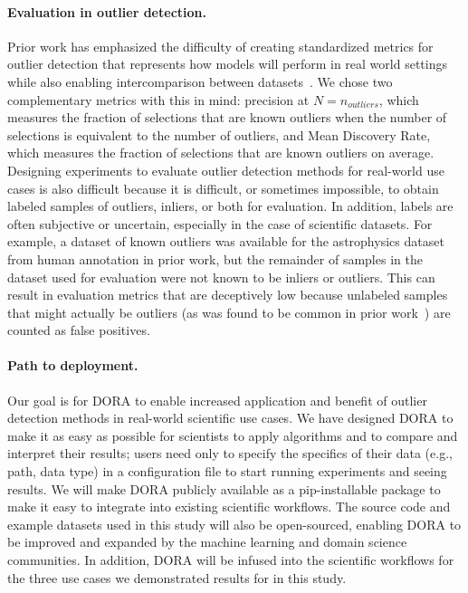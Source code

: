\documentclass[letterpaper]{article} %
\begin{document}
\paragraph{Evaluation in outlier detection.} 
Prior work has emphasized
the difficulty of creating standardized metrics for outlier detection that 
represents how models will perform in real world settings while also enabling
intercomparison between datasets~\cite{campos2016evaluation}. We chose two
complementary metrics with this in mind: precision at $N=n_{outliers}$, which
measures the fraction of selections that are known outliers when the number of
selections is equivalent to the number of outliers, and
 Mean Discovery Rate, which measures the fraction of selections that are known outliers on average. 
Designing experiments to evaluate outlier detection methods for real-world
use cases is also difficult because it is difficult, or sometimes impossible, 
to obtain labeled samples of outliers, inliers, or both for evaluation. 
In addition, labels are often subjective or uncertain, 
especially in the case of scientific datasets. For example, a dataset of known
outliers was available for the astrophysics dataset from human annotation
in prior work, but the remainder of samples in the dataset used for evaluation
were not known to be inliers or outliers. This can result in evaluation metrics
 that are deceptively low because unlabeled samples that might actually be
 outliers (as was found to be common in prior work~\cite{wagstaff:des-anom20})
 are counted as false positives. 

\paragraph{Path to deployment.} 
Our goal is for DORA to enable increased application and benefit of
outlier detection methods in real-world scientific use cases. We have 
designed DORA to make it as easy as possible for scientists to apply
algorithms and to compare and interpret their results; users need only
to specify the specifics of their data (e.g., path, data type) in a 
configuration file to start running experiments and seeing results. We will
make DORA publicly available as a pip-installable package to make it
easy to integrate into existing scientific workflows. 
The source code and example datasets used in this study will also be 
open-sourced, enabling DORA to be improved and expanded by the 
machine learning and domain science communities. 
In addition, DORA will be infused into the scientific workflows for the
three use cases we demonstrated results for in this study.
\end{document}
